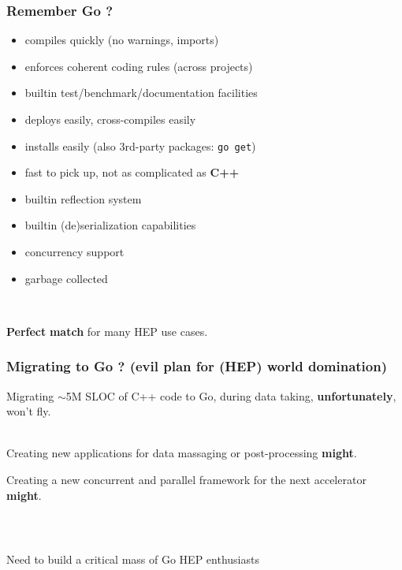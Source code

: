 \documentclass[9pt]{beamer}
\begin{document}
\begin{frame}[fragile]
\frametitle{Remember Go ?}


\begin{itemize}
\item compiles quickly (no warnings, imports)
\item enforces coherent coding rules (across projects)
\item builtin test/benchmark/documentation facilities
\item deploys easily, cross-compiles easily
\item installs easily (also 3rd-party packages: \texttt{go get})
\item fast to pick up, not as complicated as \textbf{C++}
\item builtin reflection system
\item builtin (de)serialization capabilities
\item concurrency support
\item garbage collected
\end{itemize}

\quad\\

	\begin{block}{}

		\textbf{Perfect} \textbf{match} for many HEP use cases.

	\end{block}{}


\end{frame}

\begin{frame}[fragile]
\frametitle{Migrating to Go ? (evil plan for (HEP) world domination)}


Migrating $\sim$5M SLOC of C++ code to Go, during data taking, \textbf{unfortunately}, won't fly.

\quad\\

Creating new applications for data massaging or post-processing \textbf{might}.


Creating a new concurrent and parallel framework for the next accelerator \textbf{might}.

\quad\\

	\begin{columns}
		\begin{column}{0.70\textwidth}
	\begin{block}{}
Need to build a critical mass of Go HEP enthusiasts
	\end{block}{}
		\end{column}
	\end{columns}


\end{frame}
\end{document}
